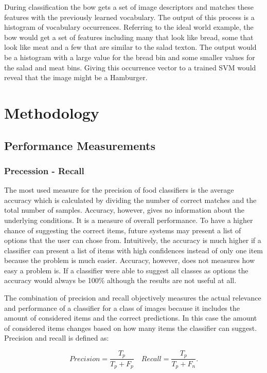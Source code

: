 During classification the \gls{bow} gets a set of image descriptors and matches these features with the previously learned vocabulary. The output of this process is a histogram of vocabulary occurrences. Referring to the ideal world example, the \gls{bow} would get a set of features including many that look like bread, some that look like meat and a few that are similar to the salad texton. The output would be a histogram with a large value for the bread bin and some smaller values for the salad and meat bins. Giving this occurrence vector to a trained SVM would reveal that the image might be a Hamburger.


\section{Methodology}
\subsection{Performance Measurements}

\subsubsection*{Precession - Recall}
The most used measure for the precision of food classifiers is the average accuracy which is calculated by dividing the number of correct matches and the total number of samples. Accuracy, however, gives no information about the underlying conditions. It is a measure of overall performance. To have a higher chance of suggesting the correct items, future systems may present a list of options that the user can chose from. Intuitively, the accuracy is much higher if a classifier can present a list of items with high confidences instead of only one item because the problem is much easier. Accuracy, however, does not measures how easy a problem is. If a classifier were able to suggest all classes as options the accuracy would always be 100\% although the results are not useful at all.

The combination of precision and recall objectively measures the actual relevance and performance of a classifier for a class of images because it includes the amount of considered items and the correct predictions. In this case the amount of considered items changes based on how many items the classifier can suggest. Precision and recall is defined as:

\begin{equation}
Precision = \frac{T_p}{T_p+F_p} \quad Recall = \frac{T_p}{T_p+F_n}.
\end{equation}

